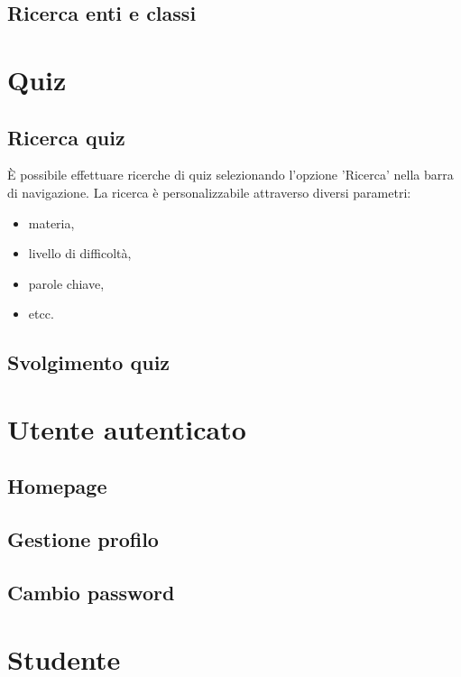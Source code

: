 \documentclass[a4paper, titlepage]{article}
\begin{document}
	\subsection{Ricerca enti e classi}
	
	
	\section{Quiz}
	
	\subsection{Ricerca quiz}
	 È possibile effettuare ricerche di quiz selezionando l'opzione 'Ricerca' nella barra di navigazione. La ricerca è personalizzabile attraverso diversi parametri:
	 \begin{itemize}
	 	\item materia,
	 	\item livello di difficoltà,
	 	\item parole chiave,
	 	\item etcc.
	 \end{itemize}
	 
	 \subsection{Svolgimento quiz}
	 
	 
	 \section{Utente autenticato}
	 
	 \subsection{Homepage}
	 
	 \subsection{Gestione profilo}
	
	 \subsection{Cambio password}
	 
	 
	 \section{Studente}
	 
\end{document}
